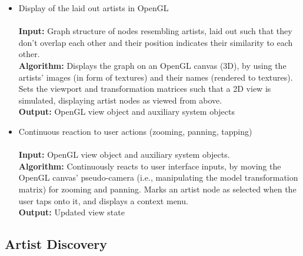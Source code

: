 \begin{itemize}
	\item Display of the laid out artists in OpenGL	\\\\
				\textbf{Input:} Graph structure of nodes resembling artists, laid out such that they don't 
				overlap each other and their position indicates their similarity to each other. \\
				\textbf{Algorithm:} Displays the graph on an OpenGL canvas (3D), by using the artists' images (in form
				of textures) and their names (rendered to textures). Sets the viewport and transformation
				matrices such that a 2D view is simulated, displaying artist nodes as viewed from above. \\
				\textbf{Output:} OpenGL view object and auxiliary system objects \\
				
	\item Continuous reaction to user actions (zooming, panning, tapping) \\\\
				\textbf{Input:} OpenGL view object and auxiliary system objects. \\
				\textbf{Algorithm:} Continuously reacts to user interface inputs, by moving the OpenGL canvas'
				pseudo-camera (i.e., manipulating the model transformation matrix) for zooming and panning.
				Marks an artist node as selected when the user taps onto it, and displays a context menu. \\
				\textbf{Output:} Updated view state
\end{itemize}

\subsection{Artist Discovery}

